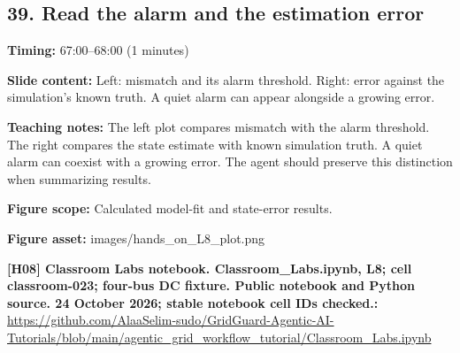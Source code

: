 \documentclass[10pt,letterpaper]{article}
\begin{document}
\subsection*{39. Read the alarm and the estimation error}
\textbf{Timing:} 67:00--68:00 (1 minutes)\par
\textbf{Slide content:} Left: mismatch and its alarm threshold. Right: error against the simulation's known truth.
A quiet alarm can appear alongside a growing error.\par
\textbf{Teaching notes:} The left plot compares mismatch with the alarm threshold. The right compares the state estimate with known simulation truth. A quiet alarm can coexist with a growing error. The agent should preserve this distinction when summarizing results.\par
\textbf{Figure scope:} Calculated model-fit and state-error results.\par
\textbf{Figure asset:} images/hands\_on\_L8\_plot.png\par
\textbf{[H08] Classroom Labs notebook. Classroom\_Labs.ipynb, L8; cell classroom-023; four-bus DC fixture. Public notebook and Python source. 24 October 2026; stable notebook cell IDs checked.:} \href{https://github.com/AlaaSelim-sudo/GridGuard-Agentic-AI-Tutorials/blob/main/agentic_grid_workflow_tutorial/Classroom_Labs.ipynb}{\small\ttfamily https:/\allowbreak{}/\allowbreak{}github.\allowbreak{}com/\allowbreak{}AlaaSelim-\allowbreak{}sudo/\allowbreak{}GridGuard-\allowbreak{}Agentic-\allowbreak{}AI-\allowbreak{}Tutorials/\allowbreak{}blob/\allowbreak{}main/\allowbreak{}agentic\_\allowbreak{}grid\_\allowbreak{}workflow\_\allowbreak{}tutorial/\allowbreak{}Classroom\_\allowbreak{}Labs.\allowbreak{}ipynb}\par
\par\medskip
\end{document}
